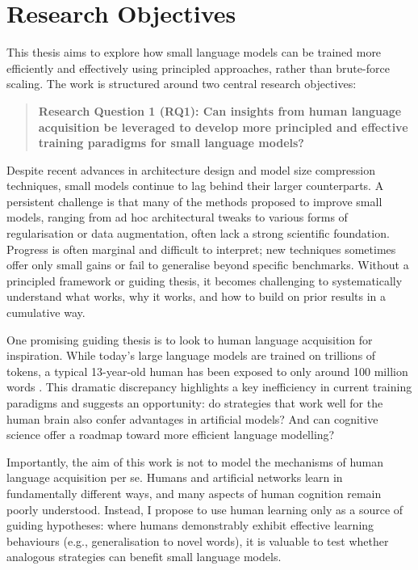 
\section*{Research Objectives}

This thesis aims to explore how small language models can be trained more efficiently and effectively using principled approaches, rather than brute-force scaling. The work is structured around two central research objectives:

\begin{quote}
    \textbf{Research Question 1 (RQ1): Can insights from human language acquisition be leveraged to develop more principled and effective training paradigms for small language models?}
\end{quote}

Despite recent advances in architecture design and model size compression techniques, small models continue to lag behind their larger counterparts. A persistent challenge is that many of the methods proposed to improve small models, ranging from ad hoc architectural tweaks to various forms of regularisation or data augmentation, often lack a strong scientific foundation. Progress is often marginal and difficult to interpret; new techniques sometimes offer only small gains or fail to generalise beyond specific benchmarks. Without a principled framework or guiding thesis, it becomes challenging to systematically understand what works, why it works, and how to build on prior results in a cumulative way.

One promising guiding thesis is to look to human language acquisition for inspiration. While today's large language models are trained on trillions of tokens, a typical 13-year-old human has been exposed to only around 100 million words \citep{warstadt2023babylm1}. This dramatic discrepancy highlights a key inefficiency in current training paradigms and suggests an opportunity: do strategies that work well for the human brain also confer advantages in artificial models? And can cognitive science offer a roadmap toward more efficient language modelling? 

Importantly, the aim of this work is not to model the mechanisms of human language acquisition per se. Humans and artificial networks learn in fundamentally different ways, and many aspects of human cognition remain poorly understood. Instead, I propose to use human learning only as a source of guiding hypotheses: where humans demonstrably exhibit effective learning behaviours (e.g., generalisation to novel words), it is valuable to test whether analogous strategies can benefit small language models.


